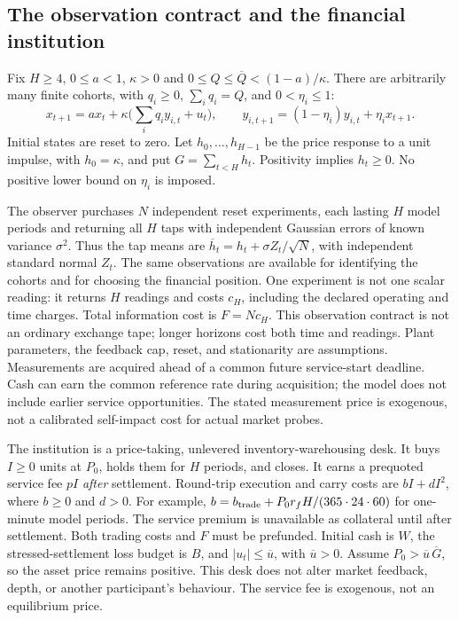 \documentclass[12pt]{article}
\theoremstyle{definition}
\theoremstyle{remark}
\begin{document}
\subsection*{The observation contract and the financial institution}
Fix $H\ge4$, $0\le a<1$, $\kappa>0$ and
$0\le Q\le\overline Q<(1-a)/\kappa$. There are arbitrarily many finite
cohorts, with $q_i\ge0$, $\sum_iq_i=Q$, and $0<\eta_i\le1$:
\[
 x_{t+1}=a x_t+\kappa\bigl(\sum_iq_i y_{i,t}+u_t\bigr),\qquad
 y_{i,t+1}=(1-\eta_i)y_{i,t}+\eta_i x_{t+1}.
\]
Initial states are reset to zero. Let $h_0,\ldots,h_{H-1}$ be the price
response to a unit impulse, with $h_0=\kappa$, and put
$G=\sum_{t<H}h_t$. Positivity implies $h_t\ge0$.
No positive lower bound on $\eta_i$ is imposed.

The observer purchases $N$ independent reset experiments, each lasting $H$
model periods and returning all $H$ taps with independent Gaussian errors of
known variance $\sigma^2$. Thus the tap means are
$\overline h_t=h_t+\sigma Z_t/\sqrt N$, with independent standard normal
$Z_t$. The same observations are available for identifying the cohorts and
for choosing the financial position. One experiment is not one scalar reading:
it returns $H$ readings and costs $c_H$, including the declared operating and
time charges. Total information cost is $F=Nc_H$. This observation contract
is not an ordinary exchange tape; longer horizons cost both time and readings.
Plant parameters, the feedback cap, reset, and stationarity are assumptions.
Measurements are acquired ahead of a common future service-start deadline.
Cash can earn the common reference rate during acquisition; the model does
not include earlier service opportunities. The stated measurement price is
exogenous, not a calibrated self-impact cost for actual market probes.

The institution is a price-taking, unlevered inventory-warehousing desk.
It buys $I\ge0$ units at $P_0$, holds them for $H$ periods, and closes.
It earns a prequoted service fee $pI$ \emph{after} settlement. Round-trip
execution and carry costs are $bI+dI^2$, where $b\ge0$ and $d>0$.
For example, $b=b_{\rm trade}+P_0 r_f H/(365\cdot24\cdot60)$ for
one-minute model periods. The service premium is unavailable as collateral
until after settlement. Both trading costs and $F$ must be prefunded.
Initial cash is $W$, the stressed-settlement loss budget is $B$, and
$|u_t|\le\overline u$, with $\overline u>0$. Assume
$P_0>\overline u\,\overline G$, so the asset price remains positive.
This desk does not alter market feedback, depth, or another participant's
behaviour. The service fee is exogenous, not an equilibrium price.
\end{document}
